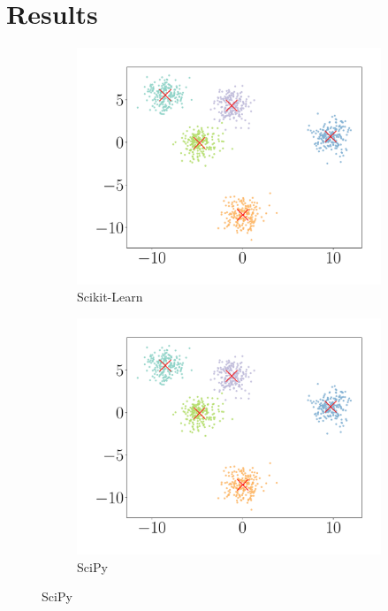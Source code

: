\documentclass{article}
\begin{document}
  \section{Results}
  \begin{figure}[H]
    \centering
    \begin{subfigure}[b]{0.32\linewidth}
      \centering
      \includegraphics[scale=0.25]{figures/sklpy1K.pdf}
      \caption{\sc Scikit-Learn}
    \end{subfigure}
    \begin{subfigure}[b]{0.32\linewidth}
      \centering
      \includegraphics[scale=0.25]{figures/scipy1K.pdf}
      \caption{\sc SciPy}

\end{subfigure}
\end{figure}
\end{document}
